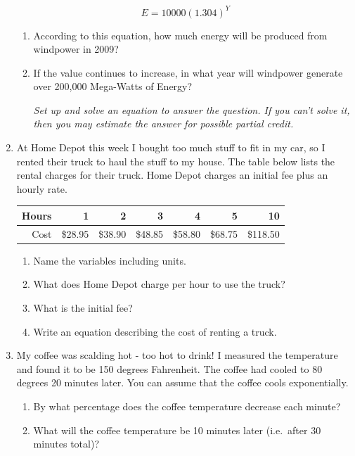 \documentclass[12pt]{article}
\begin{document}
\begin{enumerate}
$$E=10000(1.304)^Y$$

\begin{enumerate}
\item According to this equation, how much energy will be produced from windpower in 2009?
\vfill
\item If the value continues to increase, in what year will windpower generate over 200,000 Mega-Watts of Energy?

\emph{Set up and solve an equation to answer the question.  If you can't solve it, then you may estimate the answer for possible partial credit.}
\vfill
\vfill
\vfill
\end{enumerate}

\newpage %

\item At Home Depot this week I bought too much stuff to fit in my car, so I rented their truck to haul the stuff to my house.  The table below lists the rental charges for their truck.  Home Depot charges an initial fee plus an hourly rate.

\begin{center}
\begin{tabular} {|r|r|r|r|r|r|r|} \hline
Hours & 1 & 2 & 3 & 4 & 5 & 10 \\ \hline
Cost & \$28.95 & \$38.90 & \$48.85 & \$58.80 & \$68.75 & \$118.50 \\ \hline
\end{tabular}
\end{center}

\begin{enumerate}
\item Name the variables including units.
\vfill
\item What does Home Depot charge per hour to use the truck?
\vfill
\item What is the initial fee?
\vfill
\item Write an equation describing the cost of renting a truck.
\vfill
\end{enumerate}

\newpage %

\item My coffee was scalding hot - too hot to drink!  I measured the temperature and found it to be 150 degrees Fahrenheit.  The coffee had cooled to 80 degrees 20 minutes later.  You can assume that the coffee cools exponentially.

\begin{enumerate}
\item By what percentage does the coffee temperature decrease each minute?
\vfill
\item What will the coffee temperature be 10 minutes later (i.e.\ after 30 minutes total)?
\vfill
\end{enumerate}



\end{enumerate}
\end{document}
